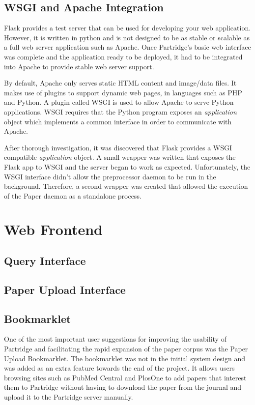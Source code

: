 \subsection{WSGI and Apache Integration}

Flask provides a test server that can be used for developing your web
application. However, it is written in python and is not designed to be as
stable or scalable as a full web server application such as Apache. Once
Partridge's basic web interface was complete and the application ready to be
deployed, it had to be integrated into Apache to provide stable web server
support.

By default, Apache only serves static HTML content and image/data files. It makes
use of plugins to support dynamic web pages, in languages such as PHP and
Python. A plugin called WSGI is used to allow Apache to serve Python
applications. WSGI requires that the Python program exposes an
\emph{application} object which implements a common interface in order to
communicate with Apache.

After thorough investigation, it was discovered that Flask provides a WSGI
compatible \emph{application} object. A small wrapper was written that exposes
the Flask app to WSGI and the server began to work as expected. Unfortunately,
the WSGI interface didn't allow the preprocessor daemon to be run in the
background. Therefore, a second wrapper was created that allowed the execution
of the Paper daemon as a standalone process.

\section{Web Frontend}

\subsection{Query Interface}

\subsection{ Paper Upload Interface }

\subsection{ Bookmarklet }

One of the most important user suggestions for improving the usability of
Partridge and facilitating the rapid expansion of the paper corpus was the
Paper Upload Bookmarklet. The bookmarklet was not in the initial system design
and was added as an extra feature towards the end of the project. It allows
users browsing sites such as PubMed Central and PlosOne to add papers that
interest them to Partridge without having to download the paper from the
journal and upload it to the Partridge server manually. 


